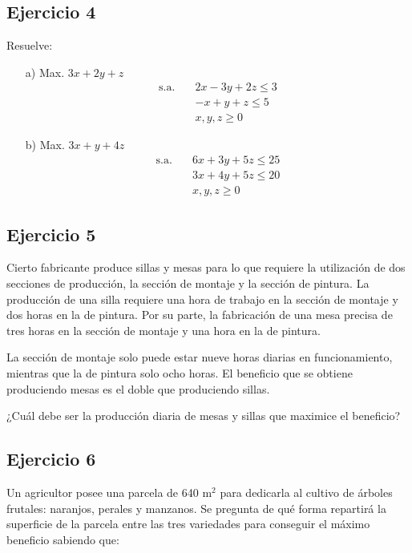 \subsection*{Ejercicio 4}
Resuelve:
\begin{itemize}
    \item[a)] Max. $3x + 2y + z$
    \begin{align*}
        \text{s.a.} \quad & 2x - 3y + 2z \leq 3 \\
        & -x + y + z \leq 5 \\
        & x, y, z \geq 0
    \end{align*}
    
    \item[b)] Max. $3x + y + 4z$
    \begin{align*}
        \text{s.a.} \quad & 6x + 3y + 5z \leq 25 \\
        & 3x + 4y + 5z \leq 20 \\
        & x, y, z \geq 0
    \end{align*}
\end{itemize}


\subsection*{Ejercicio 5}
Cierto fabricante produce sillas y mesas para lo que requiere la utilización de dos secciones de producción, la sección de montaje y la sección de pintura. La producción de una silla requiere una hora de trabajo en la sección de montaje y dos horas en la de pintura. Por su parte, la fabricación de una mesa precisa de tres horas en la sección de montaje y una hora en la de pintura.

La sección de montaje solo puede estar nueve horas diarias en funcionamiento, mientras que la de pintura solo ocho horas. El beneficio que se obtiene produciendo mesas es el doble que produciendo sillas.

¿Cuál debe ser la producción diaria de mesas y sillas que maximice el beneficio?

\subsection*{Ejercicio 6}
Un agricultor posee una parcela de 640 m$^2$ para dedicarla al cultivo de árboles frutales: naranjos, perales y manzanos. Se pregunta de qué forma repartirá la superficie de la parcela entre las tres variedades para conseguir el máximo beneficio sabiendo que:

